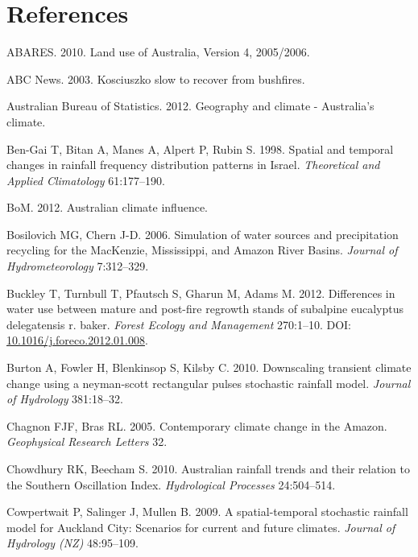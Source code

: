 \documentclass[fleqn,10pt,lineno]{wlpeerj} %
\theoremstyle{definition}
\theoremstyle{definition}
\theoremstyle{definition}
\theoremstyle{remark}
\begin{document}
\section*{References}\label{references}

\hypertarget{refs}{}
\hypertarget{ref-ABARES2010}{}
ABARES. 2010. Land use of Australia, Version 4, 2005/2006.

\hypertarget{ref-ABC2003}{}
ABC News. 2003. Kosciuszko slow to recover from bushfires.

\hypertarget{ref-ABS2012}{}
Australian Bureau of Statistics. 2012. Geography and climate -
Australia's climate.

\hypertarget{ref-Ben-Gai1998}{}
Ben-Gai T, Bitan A, Manes A, Alpert P, Rubin S. 1998. Spatial and
temporal changes in rainfall frequency distribution patterns in Israel.
\emph{Theoretical and Applied Climatology} 61:177--190.

\hypertarget{ref-BoM2012}{}
BoM. 2012. Australian climate influence.

\hypertarget{ref-Bosilovich2006}{}
Bosilovich MG, Chern J-D. 2006. Simulation of water sources and
precipitation recycling for the MacKenzie, Mississippi, and Amazon River
Basins. \emph{Journal of Hydrometeorology} 7:312--329.

\hypertarget{ref-buckley2012}{}
Buckley T, Turnbull T, Pfautsch S, Gharun M, Adams M. 2012. Differences
in water use between mature and post-fire regrowth stands of subalpine
eucalyptus delegatensis r. baker. \emph{Forest Ecology and Management}
270:1--10. DOI:
\href{https://doi.org/10.1016/j.foreco.2012.01.008}{10.1016/j.foreco.2012.01.008}.

\hypertarget{ref-Burton2010}{}
Burton A, Fowler H, Blenkinsop S, Kilsby C. 2010. Downscaling transient
climate change using a neyman-scott rectangular pulses stochastic
rainfall model. \emph{Journal of Hydrology} 381:18--32.

\hypertarget{ref-Chagnon2005}{}
Chagnon FJF, Bras RL. 2005. Contemporary climate change in the Amazon.
\emph{Geophysical Research Letters} 32.

\hypertarget{ref-Chowdhury2010}{}
Chowdhury RK, Beecham S. 2010. Australian rainfall trends and their
relation to the Southern Oscillation Index. \emph{Hydrological
Processes} 24:504--514.

\hypertarget{ref-Cowpertwait2009}{}
Cowpertwait P, Salinger J, Mullen B. 2009. A spatial-temporal stochastic
rainfall model for Auckland City: Scenarios for current and future
climates. \emph{Journal of Hydrology (NZ)} 48:95--109.
\end{document}
